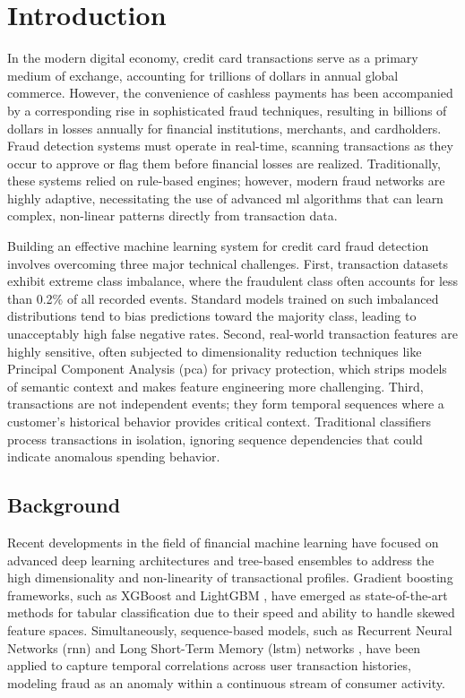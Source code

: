 \chapter{Introduction}

In the modern digital economy, credit card transactions serve as a primary medium of exchange, accounting for trillions of dollars in annual global commerce. However, the convenience of cashless payments has been accompanied by a corresponding rise in sophisticated fraud techniques, resulting in billions of dollars in losses annually for financial institutions, merchants, and cardholders. Fraud detection systems must operate in real-time, scanning transactions as they occur to approve or flag them before financial losses are realized. Traditionally, these systems relied on rule-based engines; however, modern fraud networks are highly adaptive, necessitating the use of advanced \gls{ml} algorithms that can learn complex, non-linear patterns directly from transaction data.


Building an effective machine learning system for credit card fraud detection involves overcoming three major technical challenges. First, transaction datasets exhibit extreme class imbalance, where the fraudulent class often accounts for less than 0.2\% of all recorded events. Standard models trained on such imbalanced distributions tend to bias predictions toward the majority class, leading to unacceptably high false negative rates. Second, real-world transaction features are highly sensitive, often subjected to dimensionality reduction techniques like Principal Component Analysis (\gls{pca}) for privacy protection, which strips models of semantic context and makes feature engineering more challenging. Third, transactions are not independent events; they form temporal sequences where a customer's historical behavior provides critical context. Traditional classifiers process transactions in isolation, ignoring sequence dependencies that could indicate anomalous spending behavior.

\section{Background}

Recent developments in the field of financial machine learning have focused on advanced deep learning architectures and tree-based ensembles to address the high dimensionality and non-linearity of transactional profiles. Gradient boosting frameworks, such as XGBoost \cite{chen2016xgboost} and LightGBM \cite{ke2017lightgbm}, have emerged as state-of-the-art methods for tabular classification due to their speed and ability to handle skewed feature spaces. Simultaneously, sequence-based models, such as Recurrent Neural Networks (\gls{rnn}) and Long Short-Term Memory (\gls{lstm}) networks \cite{hochreiter1997lstm}, have been applied to capture temporal correlations across user transaction histories, modeling fraud as an anomaly within a continuous stream of consumer activity.

